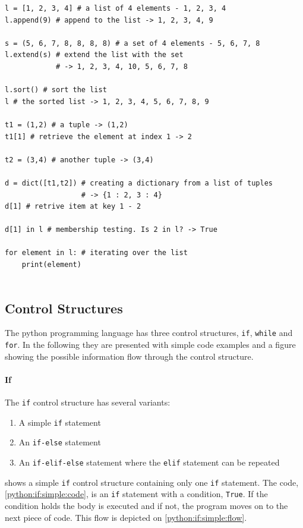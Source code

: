 \begin{lstlisting}[style=python, caption={Usage of Python collections}, label=collections]
l = [1, 2, 3, 4] # a list of 4 elements - 1, 2, 3, 4
l.append(9) # append to the list -> 1, 2, 3, 4, 9

s = (5, 6, 7, 8, 8, 8, 8) # a set of 4 elements - 5, 6, 7, 8
l.extend(s) # extend the list with the set
            # -> 1, 2, 3, 4, 10, 5, 6, 7, 8

l.sort() # sort the list
l # the sorted list -> 1, 2, 3, 4, 5, 6, 7, 8, 9

t1 = (1,2) # a tuple -> (1,2)
t1[1] # retrieve the element at index 1 -> 2

t2 = (3,4) # another tuple -> (3,4)

d = dict([t1,t2]) # creating a dictionary from a list of tuples
                  # -> {1 : 2, 3 : 4}
d[1] # retrive item at key 1 - 2
  
d[1] in l # membership testing. Is 2 in l? -> True
    
for element in l: # iterating over the list
    print(element) 
    
\end{lstlisting}

\subsection{Control Structures}\label{python:control_structures}
The python programming language has three control structures, \texttt{if}, \texttt{while} and \texttt{for}.
In the following they are presented with simple code examples and a figure showing the possible information flow through the control structure.

\paragraph{If}
The \texttt{if} control structure has several variants:
\begin{enumerate}
\item A simple \texttt{if} statement
\item An \texttt{if-else} statement
\item An \texttt{if-elif-else} statement where the \texttt{elif} statement can be repeated
\end{enumerate}

 shows a simple \texttt{if} control structure containing only one \texttt{if} statement.
The code, \cref{python:if:simple:code}, is an \texttt{if} statement with a condition, \texttt{True}.
If the condition holds the body is executed and if not, the program moves on to the next piece of code.
This flow is depicted on \cref{python:if:simple:flow}.

